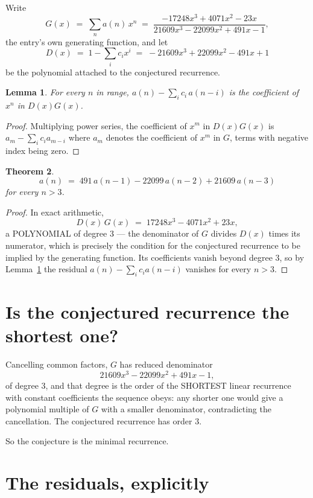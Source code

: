 \documentclass[11pt,a4paper]{article}
\theoremstyle{plain}
\newtheorem{theorem}{Theorem}
\newtheorem{lemma}[theorem]{Lemma}
\theoremstyle{definition}
\begin{document}
Write
\[
G(x)\;=\;\sum_{n}a(n)\,x^{n}\;=\;\frac{- 17248 x^{3} + 4071 x^{2} - 23 x}{21609 x^{3} - 22099 x^{2} + 491 x - 1},
\]
the entry's own generating function, and let
\[
D(x)\;=\;1-\sum_i c_i x^{i}\;=\;- 21609 x^{3} + 22099 x^{2} - 491 x + 1
\]
be the polynomial attached to the conjectured recurrence.

\begin{lemma}\label{lem:key}
For every $n$ in range, $a(n)-\sum_i c_i\,a(n-i)$ is the coefficient of $x^{n}$ in
$D(x)G(x)$.
\end{lemma}

\begin{proof}
Multiplying power series, the coefficient of $x^{m}$ in $D(x)G(x)$ is
$a_m-\sum_i c_i a_{m-i}$ where $a_m$ denotes the coefficient of $x^{m}$ in $G$, terms with
negative index being zero.
\end{proof}

\begin{theorem}
\[
a(n)\;=\;491\,a(n-1) - 22099\,a(n-2) + 21609\,a(n-3)
\]
for every $n>3$.
\end{theorem}

\begin{proof}
In exact arithmetic,
\[
D(x)\,G(x)\;=\;17248 x^{3} - 4071 x^{2} + 23 x,
\]
a POLYNOMIAL of degree $3$ --- the denominator of $G$ divides $D(x)$ times its numerator,
which is precisely the condition for the conjectured recurrence to be implied by the
generating function. Its coefficients vanish beyond degree $3$, so by
Lemma~\ref{lem:key} the residual $a(n)-\sum_ic_ia(n-i)$ vanishes for every
$n>3$.
\end{proof}

\section{Is the conjectured recurrence the shortest one?}

Cancelling common factors, $G$ has reduced denominator
\[
21609 x^{3} - 22099 x^{2} + 491 x - 1,
\]
of degree $3$, and that degree is the order of the SHORTEST linear recurrence with
constant coefficients the sequence obeys: any shorter one would give a polynomial multiple of
$G$ with a smaller denominator, contradicting the cancellation. The conjectured recurrence has
order $3$.

So the conjecture is the minimal recurrence.

\section{The residuals, explicitly}
\end{document}
